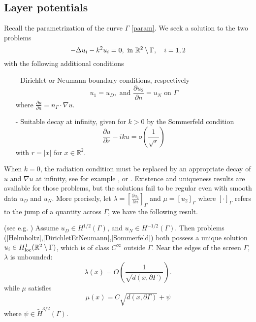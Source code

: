 \documentclass[a4paper]{article}
\begin{document}
\subsection{Layer potentials}

\label{sec:scattering}
Recall the parametrization of the curve $\Gamma$ \autoref{param}.
We seek a solution to the two problems
\begin{equation}
-\Delta u_i - k^2 u_i = 0,  \text{ in } \mathbb{R}^2 \setminus \Gamma, \quad i = 1,2
\label{Helmholtz}
\end{equation}
with the following additional conditions
\begin{itemize}
	\item[-] Dirichlet or Neumann boundary conditions, respectively
	\begin{equation}
	u_1 = u_D, \text{ and  } \dfrac{\partial u_2}{\partial n} = u_N \text{ on } \Gamma
	\label{DirichletEtNeumann}
	\end{equation}
	where $\frac{\partial u}{\partial n} = n_\Gamma \cdot \nabla u$.
	\item[-] Suitable decay at infinity, given for $k > 0$ by the Sommerfeld condition
	\begin{equation}
	\dfrac{\partial u}{\partial r} - iku = o\left(\frac{1}{\sqrt{r}}\right)
	\label{Sommerfeld}
	\end{equation}
	with $r=|x|$ for $x\in \mathbb{R}^2$.
\end{itemize}
When $k=0$, the radiation condition must be replaced by an appropriate decay of $u$ and $\nabla u$ at infinity, see for example \cite{wendland1990hypersingular,stephan1984augmented}, or \cite[Chap. 7]{mclean2000strongly} . 
Existence and uniqueness results are available for those problems, but the solutions fail to be regular even with smooth data $u_D$ and $u_N$. More precisely,  let $\lambda = \left[\frac{\partial u_1}{\partial n}\right]_\Gamma$ and $\mu = \left[u_2\right]_\Gamma$ where $ \left[\cdot \right]_\Gamma$ refers to the jump of a quantity across $\Gamma$, we have the following result.
\begin{The}
	(see e.g. \cite{stephan1984augmented,wendland1990hypersingular,monch1996numerical}) Assume $u_D \in H^{1/2}(\Gamma)$, and $u_N \in H^{-1/2}(\Gamma)$. Then problems (\ref{Helmholtz},\ref{DirichletEtNeumann},\ref{Sommerfeld}) both possess a unique solution $u_i \in H^1_\textup{loc}(\mathbb{R}^2 \setminus \Gamma)$, which is of class $C^{\infty}$ outside $\Gamma$. Near the edges of the screen $\Gamma$, $\lambda$ is unbounded:
	\[\lambda(x)  = O\left(\frac{1}{\sqrt{d(x,\partial \Gamma)}}\right).\]
	while $\mu$ satisfies
	\[\mu(x) = C\sqrt{d(x,\partial \Gamma)} + \psi\]
	where $\psi \in \tilde{H}^{3/2}(\Gamma)$.
	\label{theScatt}
\end{The}
\end{document}

